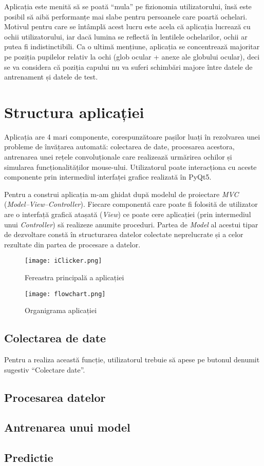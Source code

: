 Aplicația este menită să se poată ``mula'' pe fizionomia utilizatorului, însă este posibil să aibă performanțe mai slabe pentru persoanele care poartă ochelari.
Motivul pentru care se întâmplă acest lucru este acela că aplicația lucrează cu ochii utilizatorului, iar dacă lumina se reflectă în lentilele ochelarilor, ochii ar putea fi indistinctibili.
Ca o ultimă mențiune, aplicația se concentrează majoritar pe poziția pupilelor relativ la ochi (glob ocular + anexe ale globului ocular), deci se va considera că poziția capului nu va suferi schimbări majore între datele de antrenament și datele de test.

\section{Structura aplicației}
Aplicația are 4 mari componente, corespunzătoare pașilor luați în rezolvarea unei probleme de învățarea automată: colectarea de date, procesarea acestora, antrenarea unei rețele convoluționale care realizează urmărirea ochilor și simularea funcționalităților mouse-ului.
Utilizatorul poate interacționa cu aceste componente prin intermediul interfaței grafice realizată în PyQt5.

Pentru a construi aplicația m-am ghidat după modelul de proiectare \emph{MVC} (\emph{Model–View–Controller}).
Fiecare componentă care poate fi folosită de utilizator are o interfață grafică atașată (\emph{View}) ce poate cere aplicației (prin intermediul unui \emph{Controller}) să realizeze anumite proceduri.
Partea de \emph{Model} al acestui tipar de dezvoltare constă în structurarea datelor colectate neprelucrate și a celor rezultate din partea de procesare a datelor.

\begin{figure}[H]
    \centering
    \texttt{[image: iClicker.png]}
    \caption{Fereastra principală a aplicației}
\end{figure}

\begin{figure}[ht]
    \centering
    \texttt{[image: flowchart.png]}
    \caption{Organigrama aplicației}
\end{figure}

\subsection{Colectarea de date}
Pentru a realiza această funcție, utilizatorul trebuie să apese pe butonul denumit sugestiv ``Colectare date''.

\subsection{Procesarea datelor}
\subsection{Antrenarea unui model}
\subsection{Predictie}